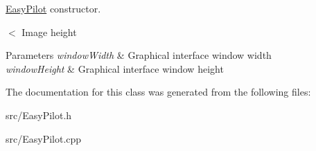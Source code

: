 \hyperlink{class_easy_pilot}{Easy\+Pilot} constructor. 

$<$ Image height 
\begin{DoxyParams}{Parameters}
{\em window\+Width} & Graphical interface window width \\
\hline
{\em window\+Height} & Graphical interface window height \\
\hline
\end{DoxyParams}


The documentation for this class was generated from the following files\+:\begin{DoxyCompactItemize}
\item 
src/Easy\+Pilot.\+h\item 
src/Easy\+Pilot.\+cpp\end{DoxyCompactItemize}
